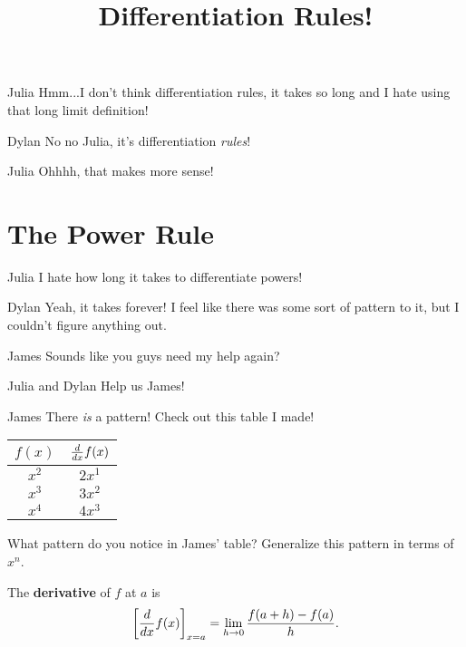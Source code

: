 \documentclass{ximera}
\title{Differentiation Rules!}
\begin{document}
\maketitle
\begin{dialogue}
\item[Julia] Hmm...I don't think differentiation rules, it takes so long and I hate using that long limit definition!
\item[Dylan] No no Julia, it's differentiation \textit{rules}!
\item[Julia] Ohhhh, that makes more sense!

\end{dialogue}
\section{The Power Rule}
\begin{dialogue}
\item[Julia] I hate how long it takes to differentiate powers!
\item[Dylan] Yeah, it takes forever! I feel like there was some sort of pattern to it, but I couldn't figure anything out.
\item[James] Sounds like you guys need my help again?
\item[Julia and Dylan] Help us James!
\item[James] There \textit{is} a pattern! Check out this table I made!
\begin{center}
\begin{tabular}{c|c}
$f(x)$ & $\frac{d}{\mathop{}\!d x} f(x)$ \\
\hline
$x^2$ & $2x^1$ \\
$x^3$ & $3x^2$ \\
$x^4$ & $4x^3$
\end{tabular}
\end{center}
\end{dialogue}
\begin{question}
What pattern do you notice in James' table? Generalize this pattern in terms of $x^n$.

\begin{multipleChoice}
\end{multipleChoice}
\end{question}

\begin{definition}
  The \textbf{derivative} of $f$ at $a$ is
  \[
  \bigg[ \frac{d}{dx} f(x) \bigg]_{x=a} = \lim_{h\to 0} \frac{f(a+h) - f(a)}{h}.
  \]
\end{definition}
\end{document}
